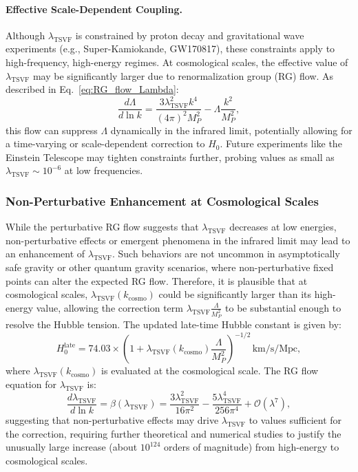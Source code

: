\documentclass[twocolumn,superscriptaddress,floatfix]{revtex4-2}
\begin{document}
\paragraph{Effective Scale-Dependent Coupling.}
Although \(\lambda_{\text{TSVF}}\) is constrained by proton decay and gravitational wave experiments (e.g., Super-Kamiokande, GW170817), these constraints apply to high-frequency, high-energy regimes. At cosmological scales, the effective value of \(\lambda_{\text{TSVF}}\) may be significantly larger due to renormalization group (RG) flow. As described in Eq.~\eqref{eq:RG_flow_Lambda}:
\begin{equation}
\frac{d\Lambda}{d \ln k} = \frac{3 \lambda^2_{\text{TSVF}} k^4}{(4\pi)^2 M_P^2} - \Lambda \frac{k^2}{M_P^2},
\label{eq:RG_flow_Lambda}
\end{equation}
this flow can suppress \(\Lambda\) dynamically in the infrared limit, potentially allowing for a time-varying or scale-dependent correction to \(H_0\). Future experiments like the Einstein Telescope may tighten constraints further, probing values as small as \(\lambda_{\text{TSVF}} \sim 10^{-6}\) at low frequencies.

\subsubsection{Non-Perturbative Enhancement at Cosmological Scales}
While the perturbative RG flow suggests that \(\lambda_{\text{TSVF}}\) decreases at low energies, non-perturbative effects or emergent phenomena in the infrared limit may lead to an enhancement of \(\lambda_{\text{TSVF}}\). Such behaviors are not uncommon in asymptotically safe gravity or other quantum gravity scenarios, where non-perturbative fixed points can alter the expected RG flow. Therefore, it is plausible that at cosmological scales, \(\lambda_{\text{TSVF}}(k_{\text{cosmo}})\) could be significantly larger than its high-energy value, allowing the correction term \(\lambda_{\text{TSVF}} \frac{\Lambda}{M_P^2}\) to be substantial enough to resolve the Hubble tension. The updated late-time Hubble constant is given by:
\begin{equation}
H_0^{\text{late}} = 74.03 \times \left(1 + \lambda_{\text{TSVF}}(k_{\text{cosmo}}) \frac{\Lambda}{M_P^2}\right)^{-1/2} \, \text{km/s/Mpc},
\label{eq:H0_late_updated}
\end{equation}
where \(\lambda_{\text{TSVF}}(k_{\text{cosmo}})\) is evaluated at the cosmological scale. The RG flow equation for \(\lambda_{\text{TSVF}}\) is:
\begin{equation}
\frac{d\lambda_{\text{TSVF}}}{d\ln k} = \beta(\lambda_{\text{TSVF}}) = \frac{3\lambda_{\text{TSVF}}^2}{16\pi^2} - \frac{5\lambda_{\text{TSVF}}^4}{256\pi^4} + \mathcal{O}(\lambda^7),
\end{equation}
suggesting that non-perturbative effects may drive \(\lambda_{\text{TSVF}}\) to values sufficient for the correction, requiring further theoretical and numerical studies to justify the unusually large increase (about \(10^{124}\) orders of magnitude) from high-energy to cosmological scales.
\end{document}
